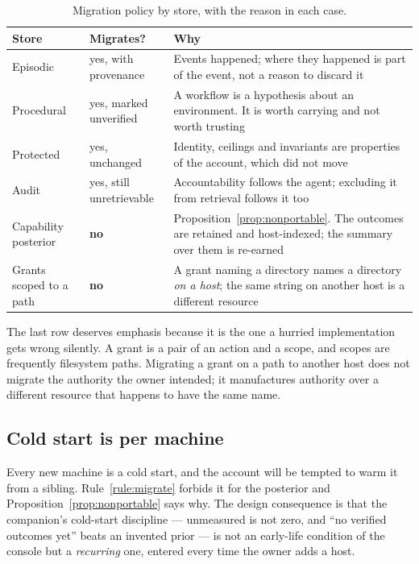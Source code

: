 \documentclass[11pt]{article}
\begin{document}
\begin{table}[h]
\centering\small
\caption{Migration policy by store, with the reason in each case.}
\label{tab:migration}
\begin{tabular}{@{}L{3.0cm}L{2.2cm}L{8.4cm}@{}}
\toprule
\textbf{Store} & \textbf{Migrates?} & \textbf{Why} \\
\midrule
Episodic & yes, with provenance & Events happened; where they happened is part of the event, not a reason to discard it \\
Procedural & yes, marked unverified & A workflow is a hypothesis about an environment. It is worth carrying and not worth trusting \\
Protected & yes, unchanged & Identity, ceilings and invariants are properties of the account, which did not move \\
Audit & yes, still unretrievable & Accountability follows the agent; excluding it from retrieval follows it too \\
Capability posterior & \textbf{no} & Proposition~\ref{prop:nonportable}. The outcomes are retained and host-indexed; the summary over them is re-earned \\
Grants scoped to a path & \textbf{no} & A grant naming a directory names a directory \emph{on a host}; the same string on another host is a different resource \\
\bottomrule
\end{tabular}
\end{table}

The last row deserves emphasis because it is the one a hurried implementation gets wrong silently. A grant is a pair of an action and a scope, and scopes are frequently filesystem paths. Migrating a grant on a path to another host does not migrate the authority the owner intended; it manufactures authority over a different resource that happens to have the same name.

\subsection{Cold start is per machine}

Every new machine is a cold start, and the account will be tempted to warm it from a sibling. Rule~\ref{rule:migrate} forbids it for the posterior and Proposition~\ref{prop:nonportable} says why. The design consequence is that the companion's cold-start discipline --- unmeasured is not zero, and ``no verified outcomes yet'' beats an invented prior --- is not an early-life condition of the console but a \emph{recurring} one, entered every time the owner adds a host.
\end{document}
